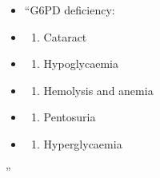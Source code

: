 \documentclass[
]{book}
\providecommand{\tightlist}{%
  \setlength{\itemsep}{0pt}\setlength{\parskip}{0pt}}
\begin{document}
\begin{itemize}
\item
  ``G6PD deficiency:
\item
  \begin{enumerate}
  \def\labelenumi{(\Alph{enumi})}
  \tightlist
  \item
    Cataract\\
  \end{enumerate}
\item
  \begin{enumerate}
  \def\labelenumi{(\Alph{enumi})}
  \setcounter{enumi}{1}
  \tightlist
  \item
    Hypoglycaemia\\
  \end{enumerate}
\item
  \begin{enumerate}
  \def\labelenumi{(\Alph{enumi})}
  \setcounter{enumi}{2}
  \tightlist
  \item
    Hemolysis and anemia\\
  \end{enumerate}
\item
  \begin{enumerate}
  \def\labelenumi{(\Alph{enumi})}
  \setcounter{enumi}{3}
  \tightlist
  \item
    Pentosuria\\
  \end{enumerate}
\item
  \begin{enumerate}
  \def\labelenumi{(\Alph{enumi})}
  \setcounter{enumi}{4}
  \tightlist
  \item
    Hyperglycaemia
  \end{enumerate}
\end{itemize}

''
\end{document}
